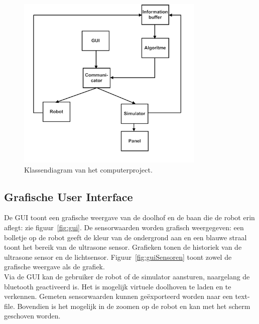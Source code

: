 \documentclass[eind]{penoverslag}
\begin{document}
\begin{figure}[tbp]
\begin{center}
    \includegraphics[width=0.8\textwidth]{Klassendiagram}
    \caption{Klassendiagram van het computerproject.}
    \label{fig:klasDia}
\end{center}
\end{figure}

\subsection{Grafische User Interface} %
\label{ssec:GUI}
De GUI toont een grafische weergave van de doolhof en de baan die de robot erin aflegt: zie figuur~\ref{fig:gui}. De sensorwaarden worden grafisch weergegeven: een bolletje op de robot geeft de kleur van de ondergrond aan en een blauwe straal toont het bereik van de ultrasone sensor. Grafieken tonen de historiek van de ultrasone sensor en de lichtsensor. Figuur~\ref{fig:guiSensoren} toont zowel de grafische weergave als de grafiek. \\

Via de GUI kan de gebruiker de robot of de simulator aansturen, naargelang de bluetooth geactiveerd is. Het is mogelijk virtuele doolhoven te laden en te verkennen. Gemeten sensorwaarden kunnen ge\"exporteerd worden naar een text-file. Bovendien is het mogelijk in de zoomen op de robot en kan met het scherm geschoven worden.
\end{document}
